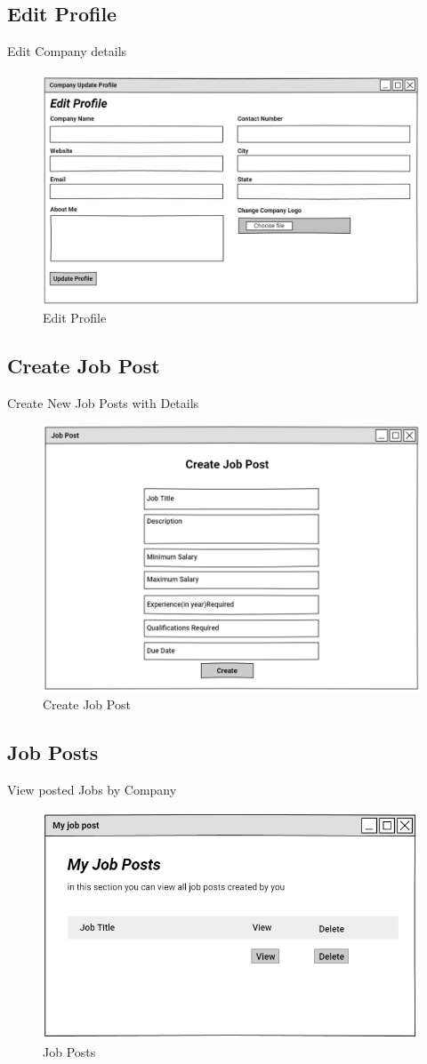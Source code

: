 \documentclass[a4paper,12pt]{report}
\begin{document}
\pagebreak
\subsection {Edit Profile}
Edit Company details
\begin{figure}[bph]
	\centering
	\includegraphics[width=.6\linewidth]{img/company/cmpnyprflupdt}
		\caption{Edit Profile}
\end{figure}

\subsection {Create Job Post}
Create New Job Posts with Details
\begin{figure}[bph]
	\centering
	\includegraphics[width=.6\linewidth]{img/company/postjob}
	\caption{Create Job Post}
\end{figure}
\pagebreak
\subsection {Job Posts}
View posted Jobs by Company
\begin{figure}[bph]
	\centering
	\includegraphics[width=.6\linewidth]{img/company/postedjobs}
	\caption{Job Posts}
\end{figure}
\end{document}
